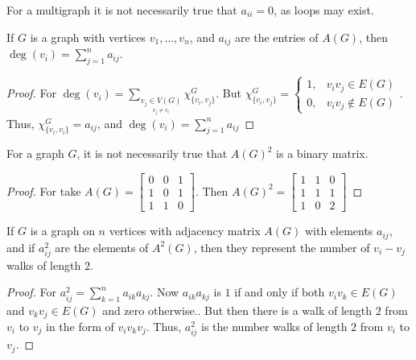 \documentclass[crop=false,class=book,oneside]{standalone}
\begin{document}
        \begin{remark}
        For a multigraph it is not necessarily true that $a_{ii}=0$, as loops may exist.
        \end{remark}
        \begin{corollary}
        If $G$ is a graph with vertices $v_1,\hdots, v_n$, and $a_{ij}$ are the entries of $A(G)$, then $\deg(v_i) = \sum_{j=1}^{n} a_{ij}$.
        \end{corollary}
        \begin{proof}
        For $\deg(v_i) = \sum_{\underset{v_j\ne v_i}{v_j\in V(G)}}\chi_{\{v_i,v_j\}}^G$. But $\chi_{\{v_i,v_j\}}^G = \begin{cases} 1, & v_iv_j\in E(G)\\ 0, & v_iv_j \notin E(G)\end{cases}$. Thus, $\chi_{\{v_i,v_i\}}^G = a_{ij}$, and $\deg(v_i) = \sum_{j=1}^{n} a_{ij}$
        \end{proof}
        \begin{theorem}
        For a graph $G$, it is not necessarily true that $A(G)^2$ is a binary matrix.
        \end{theorem}
        \begin{proof}
        For take $A(G) = \begin{bmatrix} 0 & 0 & 1 \\ 1 & 0 & 1 \\ 1& 1 & 0 \end{bmatrix}$. Then $A(G)^2 = \begin{bmatrix} 1 & 1 & 0 \\ 1 & 1 & 1 \\ 1 & 0 & 2 \end{bmatrix}$
        \end{proof}
        \begin{theorem}
        If $G$ is a graph on $n$ vertices with adjacency matrix $A(G)$ with elements $a_{ij}$, and if $a^2_{ij}$ are the elements of $A^2(G)$, then they represent the number of $v_{i}-v_{j}$ walks of length $2$.
        \end{theorem}
        \begin{proof}
        For $a^2_{ij} = \sum_{k=1}^{n} a_{ik}a_{kj}$. Now $a_{ik}a_{kj}$ is $1$ if and only if both $v_iv_k \in E(G)$ and $v_kv_j \in E(G)$ and zero otherwise.. But then there is a walk of length $2$ from $v_i$ to $v_j$ in the form of $v_i v_k v_j$. Thus, $a^2_{ij}$ is the number walks of length $2$ from $v_i$ to $v_j$.
        \end{proof} 
\end{document}
